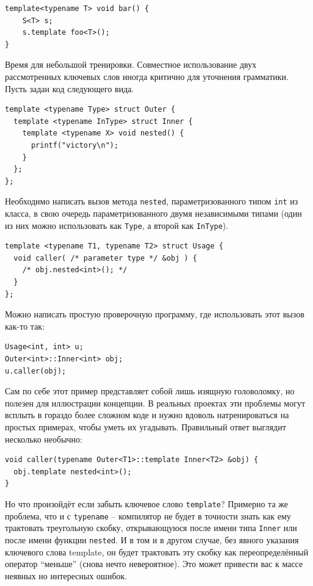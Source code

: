 \documentclass[a4paper,12pt,oneside]{book}
\begin{document}
\begin{lstlisting}
template<typename T> void bar() {
    S<T> s;
    s.template foo<T>();
}
\end{lstlisting}

Время для небольшой тренировки. Совместное использование двух рассмотренных ключевых слов иногда критично для уточнения грамматики. Пусть задан код следующего вида.

\begin{lstlisting}
template <typename Type> struct Outer {
  template <typename InType> struct Inner {
    template <typename X> void nested() {
      printf("victory\n");
    }
  };
}; 
\end{lstlisting}

Необходимо написать вызов метода \lstinline!nested!, параметризованного типом \lstinline!int! из класса, в свою очередь параметризованного двумя независимыми типами (один из них можно использовать как \lstinline!Type!, а второй как \lstinline!InType!).

\begin{lstlisting}
template <typename T1, typename T2> struct Usage {
  void caller( /* parameter type */ &obj ) {
    /* obj.nested<int>(); */
  }
};
\end{lstlisting}

Можно написать простую проверочную программу, где использовать этот вызов как-то так:

\begin{lstlisting}
Usage<int, int> u;
Outer<int>::Inner<int> obj;
u.caller(obj);
\end{lstlisting}

Сам по себе этот пример представляет собой лишь изящную головоломку, но полезен для иллюстрации концепции. В реальных проектах эти проблемы могут всплыть в гораздо более сложном коде и нужно вдоволь натренироваться на простых примерах, чтобы уметь их угадывать. Правильный ответ выглядит несколько необычно:

\begin{lstlisting}
void caller(typename Outer<T1>::template Inner<T2> &obj) { 
  obj.template nested<int>();
}
\end{lstlisting}

Но что произойдёт если забыть ключевое слово \lstinline!template!? Примерно та же проблема, что и с \lstinline!typename! -- компилятор не будет в точности знать как ему трактовать треугольную скобку, открывающуюся после имени типа \lstinline!Inner! или после имени функции \lstinline!nested!. И в том и в другом случае, без явного указания ключевого слова template, он будет трактовать эту скобку как переопределённый оператор ``меньше'' (снова нечто невероятное). Это может привести вас к массе неявных но интересных ошибок.
\end{document}
